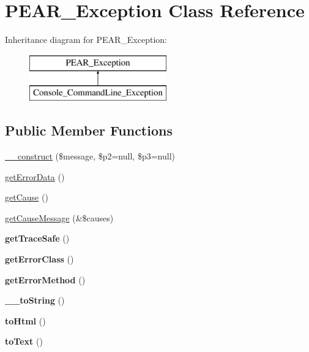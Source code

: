 \hypertarget{class_p_e_a_r___exception}{
\section{PEAR\_\-Exception Class Reference}
\label{class_p_e_a_r___exception}
}
Inheritance diagram for PEAR\_\-Exception:\begin{figure}[H]
\begin{center}
\leavevmode
\includegraphics[height=2.000000cm]{class_p_e_a_r___exception}
\end{center}
\end{figure}
\subsection*{Public Member Functions}
\begin{DoxyCompactItemize}
\item 
\hyperlink{class_p_e_a_r___exception_a67c5e674888283173defbcbb65c52677}{\_\-\_\-construct} (\$message, \$p2=null, \$p3=null)
\item 
\hyperlink{class_p_e_a_r___exception_ac8f7ee3cf7c9b4b91df8e2a2889fce3e}{getErrorData} ()
\item 
\hyperlink{class_p_e_a_r___exception_ad512534cd2d2ad781a5e5152efd4c088}{getCause} ()
\item 
\hyperlink{class_p_e_a_r___exception_a068c72159b9007db06d4b4de5c2568a9}{getCauseMessage} (\&\$causes)
\item 
\hypertarget{class_p_e_a_r___exception_a4b44bdc08deded3f53f07b4dbf5e4037}{
{\bfseries getTraceSafe} ()}
\label{class_p_e_a_r___exception_a4b44bdc08deded3f53f07b4dbf5e4037}

\item 
\hypertarget{class_p_e_a_r___exception_a3e3242fbcf281cc625f10f7f8e9c8a54}{
{\bfseries getErrorClass} ()}
\label{class_p_e_a_r___exception_a3e3242fbcf281cc625f10f7f8e9c8a54}

\item 
\hypertarget{class_p_e_a_r___exception_a7f048f63bf12cca5b4c2a68d0527a573}{
{\bfseries getErrorMethod} ()}
\label{class_p_e_a_r___exception_a7f048f63bf12cca5b4c2a68d0527a573}

\item 
\hypertarget{class_p_e_a_r___exception_a7516ca30af0db3cdbf9a7739b48ce91d}{
{\bfseries \_\-\_\-toString} ()}
\label{class_p_e_a_r___exception_a7516ca30af0db3cdbf9a7739b48ce91d}

\item 
\hypertarget{class_p_e_a_r___exception_a816fd0d968beb38c3fffe1cce71a0b58}{
{\bfseries toHtml} ()}
\label{class_p_e_a_r___exception_a816fd0d968beb38c3fffe1cce71a0b58}

\item 
\hypertarget{class_p_e_a_r___exception_a8d5ee237e10ecd169b3ff04616986a40}{
{\bfseries toText} ()}
\label{class_p_e_a_r___exception_a8d5ee237e10ecd169b3ff04616986a40}

\end{DoxyCompactItemize}
